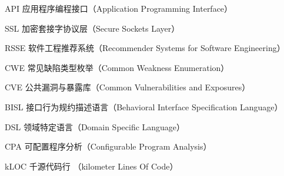 \begin{denotation}[3cm]
\item[API] 应用程序编程接口（Application Programming Interface）
\item[SSL] 加密套接字协议层（Secure Sockets Layer）
\item[RSSE] 软件工程推荐系统（Recommender Systems for Software Engineering）
\item[CWE] 常见缺陷类型枚举（Common Weakness Enumeration）
\item[CVE] 公共漏洞与暴露库（Common Vulnerabilities and Exposures）
\item[BISL] 接口行为规约描述语言（Behavioral Interface Specification Language）
\item[DSL] 领域特定语言（Domain Specific Language）
\item[CPA] 可配置程序分析（Configurable Program Analysis）
\item[kLOC] 千源代码行 （kilometer Lines Of Code）
\end{denotation}
